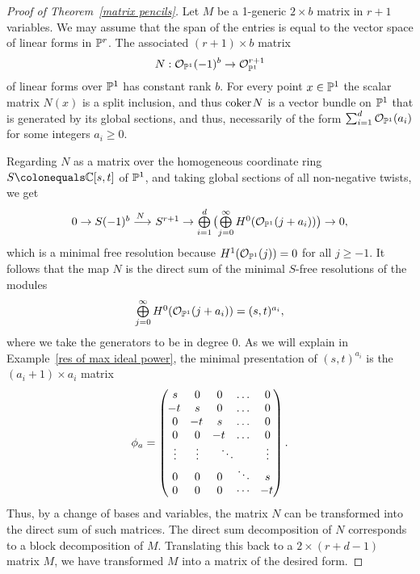 \begin{proof}[Proof of Theorem~\ref{matrix pencils}]
Let $M$ be a 1-generic $2\times b$ matrix in $r+1$ variables. We may
assume that the span of the entries
is equal to the vector space of linear forms in $\mathbb P^{r}$. The associated
$(r+1)\times b$ matrix
$$
N: {\mathcal O}_{\mathbb P^{1}}(-1)^{b} \to {\mathcal O}_{\mathbb P^{1}}^{r+1}
$$
of linear forms over $\mathbb P^{1}$ has constant rank $b$.
For every point $x\in \mathbb P^{1}$ the scalar matrix $N(x)$ is a split
inclusion, and thus
${\rm{coker}\kern1pt} N$ is a vector bundle on $\mathbb P^{1}$ that is generated by its global sections, and thus, necessarily of the form $\sum_{i
=1}^{d}{\mathcal O}_{\mathbb P^{1}}(a_{i})$ for some
integers $a_{i}\geq 0$.

Regarding $N$ as a matrix over the homogeneous coordinate ring $S\colonequals \CC[s,t]$ of $\mathbb P^{1}$, and taking global sections of all
non-negative twists, we get
$$
\tsty
0\to S(-1)^{b} \ruto {N}
S^{r+1}  \to \bigoplus\limits_{i = 1}^{d}\,\bigl(
\bigoplus\limits_{j=0}^{\infty}H^{0}(\sO_{\PP^{1}}(j+a_{i}))\bigr)\to 0,
$$
which is a minimal free resolution because $H^{1}({\mathcal O}_{\mathbb P^{1}}(j)) = 0$ for all $j\geq -1$.
It follows that the map $N$ is the direct
sum of the minimal $S$-free resolutions
of the modules
$$
\textstyle
\bigoplus\limits_{j=0}^{\infty}H^{0}({\mathcal O}_{\mathbb P^{1}}(j+a_{i})) = (s,t)^{a_{i}},
$$
where we take the generators to be in degree 0.
As we will explain in Example~\ref{res of max ideal power}, the minimal
presentation of $(s,t)^{a_{i}}$ is the $(a_{i}+1)\times a_{i}$ matrix
$$
\phi_a=
\left(\,
\begin{matrix}
s&0&0&\dots&0\\
\!-t&s&0&\dots&0\\
0&\!-t&s&\dots&0\\
0&0&\!-t&\dots&0\\
\vdots&\vdots&\rlap{\,$\ddots$}&&\vdots\\
0&0&0&\ddots&s\\
0&0&0&\cdots&\!-t\\
\end{matrix}
\right)
.
\label{phia} %
$$
 Thus, by a change of bases and variables, the matrix $N$ can be
transformed into the direct sum of such matrices.
The direct sum decomposition of $N$ corresponds to a block decomposition
of $M$. Translating this
back to a $2\times (r+d-1)$ matrix $M$, we have
transformed $M$ into a matrix of
the desired form.
\end{proof}

